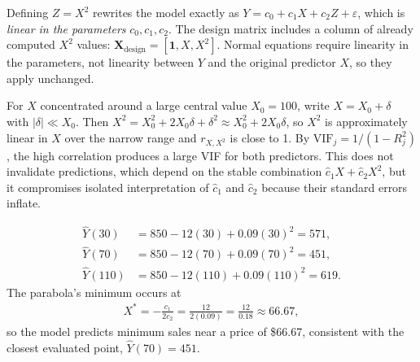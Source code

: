 \begin{solproblema}[prob:c772cd1]
Defining $Z=X^2$ rewrites the model exactly as $Y=c_0+c_1X+c_2Z+\varepsilon$, which is \emph{linear in the parameters} $c_0,c_1,c_2$. The design matrix includes a column of already computed $X^2$ values: $\mathbf X_{\text{design}}=[\mathbf1,X,X^2]$. Normal equations require linearity in the parameters, not linearity between $Y$ and the original predictor $X$, so they apply unchanged.
\end{solproblema}

\begin{solproblema}[prob:6954b16]
For $X$ concentrated around a large central value $X_0=100$, write $X=X_0+\delta$ with $|\delta|\ll X_0$. Then $X^2=X_0^2+2X_0\delta+\delta^2\approx X_0^2+2X_0\delta$, so $X^2$ is approximately linear in $X$ over the narrow range and $r_{X,X^2}$ is close to 1. By $\text{VIF}_j=1/(1-R_j^2)$, the high correlation produces a large VIF for both predictors. This does not invalidate predictions, which depend on the stable combination $\hat c_1X+\hat c_2X^2$, but it compromises isolated interpretation of $\hat c_1$ and $\hat c_2$ because their standard errors inflate.
\end{solproblema}

\begin{solproblema}[prob:bc664de]
\begin{align}
\hat Y(30)&=850-12(30)+0.09(30)^2=571,\\
\hat Y(70)&=850-12(70)+0.09(70)^2=451,\\
\hat Y(110)&=850-12(110)+0.09(110)^2=619.
\end{align}
The parabola's minimum occurs at
\begin{align}
X^*=-\frac{c_1}{2c_2}=\frac{12}{2(0.09)}=\frac{12}{0.18}\approx66.67,
\end{align}
so the model predicts minimum sales near a price of \$66.67, consistent with the closest evaluated point, $\hat Y(70)=451$.
\end{solproblema}
